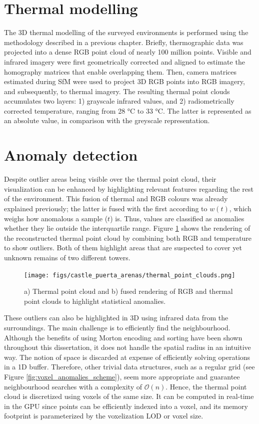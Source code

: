 \section{Thermal modelling}

The 3D thermal modelling of the surveyed environments is performed using the methodology described in a previous chapter. Briefly, thermographic data was projected into a dense RGB point cloud of nearly 100 million points. Visible and infrared imagery were first geometrically corrected and aligned to estimate the homography matrices that enable overlapping them. Then, camera matrices estimated during SfM were used to project 3D RGB points into RGB imagery, and subsequently, to thermal imagery. The resulting thermal point clouds accumulates two layers: 1) grayscale infrared values, and 2) radiometrically corrected temperature, ranging from 28 \si{\celsius} to 33 \si{\celsius}. The latter is represented as an absolute value, in comparison with the greyscale representation.

\section{Anomaly detection}

Despite outlier areas being visible over the thermal point cloud, their visualization can be enhanced by highlighting relevant features regarding the rest of the environment. This fusion of thermal and RGB colours was already explained previously; the latter is fused with the first according to $w(t)$, which weighs how anomalous a sample ($t$) is. Thus, values are classified as anomalies whether they lie outside the interquartile range. Figure \ref{fig:thermal_anomaly_detection_3d} shows the rendering of the reconstructed thermal point cloud by combining both RGB and temperature to show outliers. Both of them highlight areas that are suspected to cover yet unknown remains of two different towers. 

\begin{figure}[ht]
    \centering
    \texttt{[image: figs/castle\_puerta\_arenas/thermal\_point\_clouds.png]}
	\caption{a) Thermal point cloud and b) fused rendering of RGB and thermal point clouds to highlight statistical anomalies.}
	\label{fig:thermal_anomaly_detection_3d}
\end{figure}

These outliers can also be highlighted in 3D using infrared data from the surroundings. The main challenge is to efficiently find the neighbourhood. Although the benefits of using Morton encoding and sorting have been shown throughout this dissertation, it does not handle the spatial radius in an intuitive way. The notion of space is discarded at expense of efficiently solving operations in a 1D buffer. Therefore, other trivial data structures, such as a regular grid (see Figure \ref{fig:voxel_anomalies_scheme}), seem more appropriate and guarantee neighbourhood searches with a complexity of $\mathcal{O}(n)$. Hence, the thermal point cloud is discretized using voxels of the same size. It can be computed in real-time in the GPU since points can be efficiently indexed into a voxel, and its memory footprint is parameterized by the voxelization LOD or voxel size.

